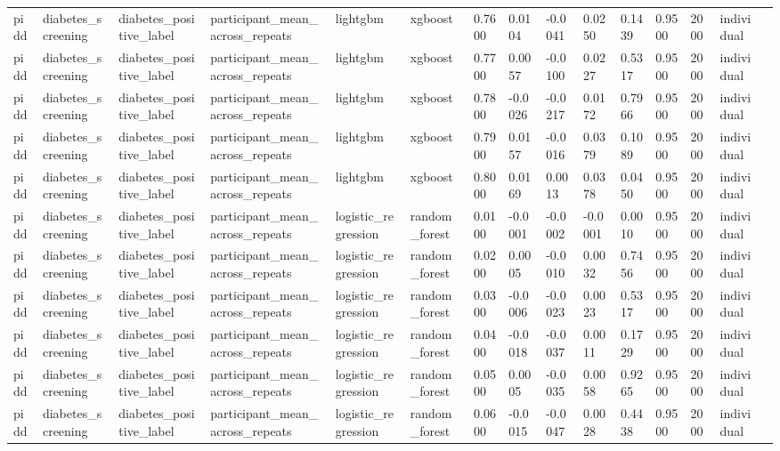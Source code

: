 \begin{tabular}{lllllllllllllll}
pidd & diabetes\_screening & diabetes\_positive\_label & participant\_mean\_across\_repeats & lightgbm & xgboost & 0.7600 & 0.0104 & -0.0041 & 0.0250 & 0.1439 & 0.9500 & 2000 & individual &  \\
pidd & diabetes\_screening & diabetes\_positive\_label & participant\_mean\_across\_repeats & lightgbm & xgboost & 0.7700 & 0.0057 & -0.0100 & 0.0227 & 0.5317 & 0.9500 & 2000 & individual &  \\
pidd & diabetes\_screening & diabetes\_positive\_label & participant\_mean\_across\_repeats & lightgbm & xgboost & 0.7800 & -0.0026 & -0.0217 & 0.0172 & 0.7966 & 0.9500 & 2000 & individual &  \\
pidd & diabetes\_screening & diabetes\_positive\_label & participant\_mean\_across\_repeats & lightgbm & xgboost & 0.7900 & 0.0157 & -0.0016 & 0.0379 & 0.1089 & 0.9500 & 2000 & individual &  \\
pidd & diabetes\_screening & diabetes\_positive\_label & participant\_mean\_across\_repeats & lightgbm & xgboost & 0.8000 & 0.0169 & 0.0013 & 0.0378 & 0.0450 & 0.9500 & 2000 & individual &  \\
pidd & diabetes\_screening & diabetes\_positive\_label & participant\_mean\_across\_repeats & logistic\_regression & random\_forest & 0.0100 & -0.0001 & -0.0002 & -0.0001 & 0.0010 & 0.9500 & 2000 & individual &  \\
pidd & diabetes\_screening & diabetes\_positive\_label & participant\_mean\_across\_repeats & logistic\_regression & random\_forest & 0.0200 & 0.0005 & -0.0010 & 0.0032 & 0.7456 & 0.9500 & 2000 & individual &  \\
pidd & diabetes\_screening & diabetes\_positive\_label & participant\_mean\_across\_repeats & logistic\_regression & random\_forest & 0.0300 & -0.0006 & -0.0023 & 0.0023 & 0.5317 & 0.9500 & 2000 & individual &  \\
pidd & diabetes\_screening & diabetes\_positive\_label & participant\_mean\_across\_repeats & logistic\_regression & random\_forest & 0.0400 & -0.0018 & -0.0037 & 0.0011 & 0.1729 & 0.9500 & 2000 & individual &  \\
pidd & diabetes\_screening & diabetes\_positive\_label & participant\_mean\_across\_repeats & logistic\_regression & random\_forest & 0.0500 & 0.0005 & -0.0035 & 0.0058 & 0.9265 & 0.9500 & 2000 & individual &  \\
pidd & diabetes\_screening & diabetes\_positive\_label & participant\_mean\_across\_repeats & logistic\_regression & random\_forest & 0.0600 & -0.0015 & -0.0047 & 0.0028 & 0.4438 & 0.9500 & 2000 & individual &  \\

\end{tabular}
